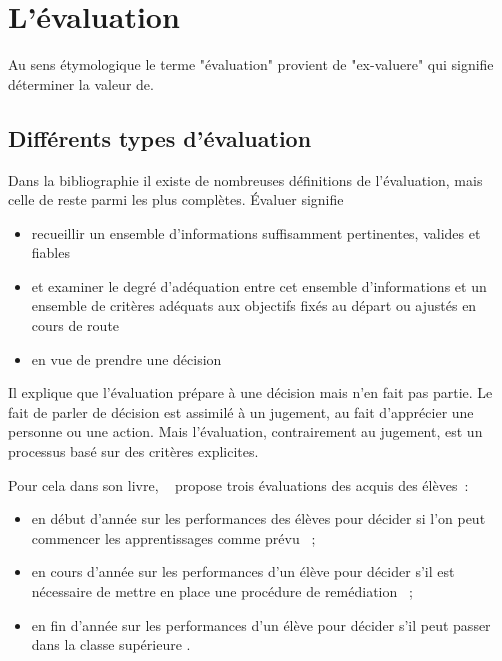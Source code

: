 \section{L'évaluation}

Au sens étymologique le terme "évaluation" provient de "ex-valuere" qui signifie déterminer la valeur de.

\subsection{Différents types d'évaluation}

Dans la bibliographie il existe de nombreuses définitions de l'évaluation, mais celle de \cite{de_ketele_levaluation_1989} reste parmi les plus complètes.
\og Évaluer signifie
\begin{itemize} 
\item recueillir un ensemble d'informations suffisamment pertinentes, valides et fiables
\item et examiner le degré d'adéquation entre cet ensemble d'informations et un ensemble de critères adéquats aux objectifs fixés au départ ou ajustés en cours de route
\item en vue de prendre une décision \fg
\end{itemize}


Il explique que l'évaluation prépare à une décision mais n'en fait pas partie. 
Le fait de parler de décision est assimilé à un jugement, au fait d'apprécier une personne ou une action. 
Mais l'évaluation, contrairement au jugement, est un processus basé sur des critères explicites.

Pour cela dans son livre, ~\cite{roegiers_lecole_2010} propose trois évaluations des acquis des élèves~:
\begin{itemize}
\item \og en début d'année sur les performances des élèves pour décider si l'on peut commencer les apprentissages comme prévu \fg ~;
\item \og en cours d'année sur les performances d'un élève pour décider s'il est nécessaire de mettre en place une procédure de remédiation \fg ~;
\item \og en fin d'année sur les performances d'un élève pour décider s'il peut passer dans la classe supérieure \fg .
\end{itemize}


